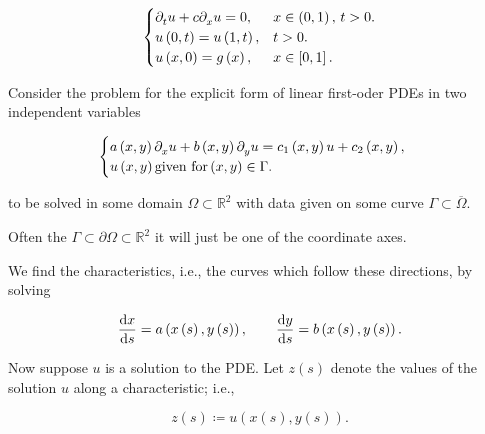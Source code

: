 \begin{equation*}
	\begin{cases}
		\difcp{u}{t}+
		c\difcp{u}{x}=0,   & x\in\left(0,1\right),\, t>0. \\
		u\left(0,t\right)=
		u\left(1,t\right), & t>0.                         \\
		u\left(x,0\right)=
		g\left(x\right),   & x\in\left[0,1\right].
	\end{cases}
\end{equation*}

Consider the problem for the explicit form of linear first-oder
PDEs in two independent variables

\begin{equation*}
	\begin{cases}
		a
		\left(x,y\right)
		\difcp{u}{x}+
		b
		\left(x,y\right)
		\difcp{u}{y}=
		c_{1}
		\left(x,y\right)
		u+
		c_{2}
		\left(x,y\right), \\
		u\left(x,y\right)
		\text{given for}
		\left(x,y\right)\in
		\Gamma.
	\end{cases}
\end{equation*}

to be solved in some domain
\begin{math}
	\Omega\subset
	\mathbb{R}^{2}
\end{math}
with data given on some curve
\begin{math}
	\Gamma\subset
	\overline\Omega
\end{math}.

Often the
\begin{math}
	\Gamma\subset
	\partial\Omega\subset
	\mathbb{R}^{2}
\end{math}
it will just be one of the coordinate axes.

We find the characteristics, i.e., the curves which follow these
directions, by solving

\begin{equation*}
	\diff{x}{s}=
	a
	\left(
	x\left(s\right),
	y\left(s\right)
	\right),\qquad
	\diff{y}{s}=
	b
	\left(
	x\left(s\right),
	y\left(s\right)
	\right).
\end{equation*}

Now suppose $u$ is a solution to the PDE.
Let $z\left(s\right)$ denote the values of the solution $u$ along a
characteristic; i.e.,

\begin{equation*}
	z
	\left(s\right)\coloneqq
	u
	\left(
	x\left(s\right),
	y\left(s\right)
	\right).
\end{equation*}

